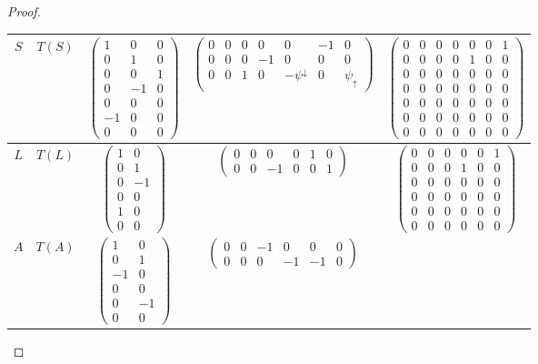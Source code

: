 \documentclass[11pt]{amsart}
\theoremstyle{definition}
\theoremstyle{remark}
\numberwithin{equation}{section}
\begin{document}
\begin{proof}
\begin{table}
\begin{tabular}{c|c|c|c|c}
	$S$ & $T(S)$ & $\left(\begin{array}{ccc} 1 & 0 & 0 \\ 0 & 1 & 0 \\ 0 & 0 & 1 \\ 0 & -1 & 0 \\ 0 & 0 & 0 \\ -1 & 0 & 0 \\ 0 & 0 & 0 \end{array}\right)$ & $\left(\begin{array}{ccccccc} 0 & 0 & 0 & 0 & 0 & -1 & 0 \\ 0 & 0 & 0 & -1 & 0 & 0 & 0 \\ 0 & 0 & 1 & 0 & -\psi^{\downarrow} &  0 & \psi_{\uparrow}\end{array}\right)$ & $\left(\begin{array}{ccccccc} 0 & 0 & 0 & 0 & 0 & 0 & 1 \\ 0 & 0 & 0 & 0 & 1 & 0 & 0 \\ 0 & 0 & 0 & 0 & 0 & 0 & 0 \\ 0 & 0 & 0 & 0 & 0 & 0 & 0 \\ 0 & 0 & 0 & 0 & 0 & 0 & 0 \\ 0 & 0 & 0 & 0 & 0 & 0 & 0 \\ 0 & 0 & 0 & 0 & 0 & 0 & 0 \end{array}\right)$	\\ \hline $L$ & $T(L)$ & $\left(\begin{array}{cc} 1 & 0 \\ 0 & 1 \\ 0 & -1 \\ 0 & 0 \\ 1 & 0 \\ 0 & 0 \end{array}\right)$ & $\left(\begin{array}{cccccc} 0 & 0 & 0 & 0 & 1 & 0 \\ 0 & 0 & -1 & 0 & 0 & 1\end{array}\right)$ & $\left(\begin{array}{cccccc} 0 & 0 & 0 & 0 & 0 & 1 \\ 0 & 0 & 0 & 1 & 0 & 0 \\ 0 & 0 & 0 & 0 & 0 & 0 \\ 0 & 0 & 0 & 0 & 0 & 0 \\ 0 & 0 & 0 & 0 & 0 & 0 \\ 0 & 0 & 0 & 0 & 0 & 0\end{array}\right)$ \\ \hline $A$ & $T(A)$ & $\left(\begin{array}{cc} 1 & 0 \\ 0 & 1 \\ -1 & 0 \\ 0 & 0 \\ 0 & -1 \\ 0 & 0 \end{array}\right)$ & $\left(\begin{array}{cccccc} 0 & 0 & -1 & 0 & 0 & 0 \\ 0 & 0 & 0 & -1 & -1 & 0 \end{array}\right)$ & 
\end{tabular}
\end{table}
\end{proof}
\end{document}
